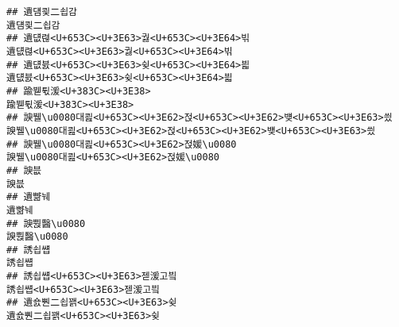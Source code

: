 \documentclass[]{article}
\begin{document}
\begin{verbatim}
## 遺덈쾿二쇱감                                                                                                                                                                                                     遺덈쾿二쇱감
## 遺덊렪<U+653C><U+3E63>궗<U+653C><U+3E64>빆                                                                                                                                                                 遺덊렪<U+653C><U+3E63>궗<U+653C><U+3E64>빆
## 遺덊븘<U+653C><U+3E63>슂<U+653C><U+3E64>븳                                                                                                                                                                 遺덊븘<U+653C><U+3E63>슂<U+653C><U+3E64>븳
## 踰붿튃湲<U+383C><U+3E38>                                                                                                                                                                                         踰붿튃湲<U+383C><U+3E38>
## 諛뷀\u0080대쾶<U+653C><U+3E62>젅<U+653C><U+3E62>뱾<U+653C><U+3E63>씠                                                                                                                         諛뷀\u0080대쾶<U+653C><U+3E62>젅<U+653C><U+3E62>뱾<U+653C><U+3E63>씠
## 諛뷀\u0080대쾶<U+653C><U+3E62>젅媛\u0080                                                                                                                                                         諛뷀\u0080대쾶<U+653C><U+3E62>젅媛\u0080
## 諛븞                                                                                                                                                                                                                     諛븞
## 遺뺢눼                                                                                                                                                                                                                 遺뺢눼
## 諛뿭醫\u0080                                                                                                                                                                                                     諛뿭醫\u0080
## 誘쇱썝                                                                                                                                                                                                                 誘쇱썝
## 誘쇱썝<U+653C><U+3E63>젣湲고빀                                                                                                                                                                             誘쇱썝<U+653C><U+3E63>젣湲고빀
## 遺숈뿬二쇱꽭<U+653C><U+3E63>슂                                                                                                                                                                             遺숈뿬二쇱꽭<U+653C><U+3E63>슂

\end{verbatim}
\end{document}
